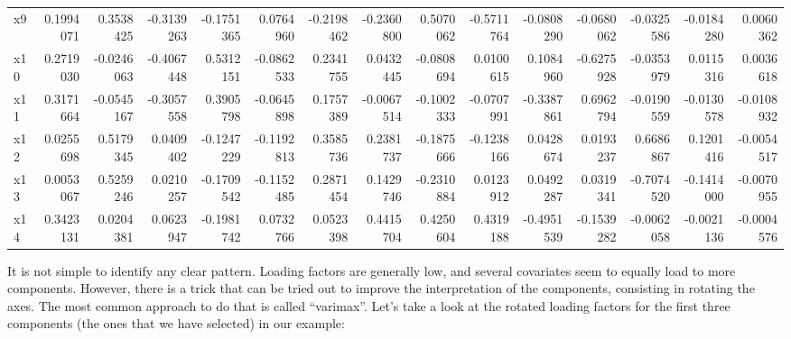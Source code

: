 \documentclass[
]{book}
\newenvironment{Shaded}{\begin{snugshade}}{\end{snugshade}}
\newcommand{\DecValTok}[1]{\textcolor[rgb]{0.00,0.00,0.81}{#1}}
\newcommand{\FunctionTok}[1]{\textcolor[rgb]{0.00,0.00,0.00}{#1}}
\newcommand{\NormalTok}[1]{#1}
\newcommand{\OtherTok}[1]{\textcolor[rgb]{0.56,0.35,0.01}{#1}}
\newcommand{\SpecialCharTok}[1]{\textcolor[rgb]{0.00,0.00,0.00}{#1}}
\begin{document}
\begin{table}
\begin{tabular}[t]{lrrrrrrrrrrrrrr}
x9 & 0.1994071 & 0.3538425 & -0.3139263 & -0.1751365 & 0.0764960 & -0.2198462 & -0.2360800 & 0.5070062 & -0.5711764 & -0.0808290 & -0.0680062 & -0.0325586 & -0.0184280 & 0.0060362\\
x10 & 0.2719030 & -0.0246063 & -0.4067448 & 0.5312151 & -0.0862533 & 0.2341755 & 0.0432445 & -0.0808694 & 0.0100615 & 0.1084960 & -0.6275928 & -0.0353979 & 0.0115316 & 0.0036618\\
\addlinespace
x11 & 0.3171664 & -0.0545167 & -0.3057558 & 0.3905798 & -0.0645898 & 0.1757389 & -0.0067514 & -0.1002333 & -0.0707991 & -0.3387861 & 0.6962794 & -0.0190559 & -0.0130578 & -0.0108932\\
x12 & 0.0255698 & 0.5179345 & 0.0409402 & -0.1247229 & -0.1192813 & 0.3585736 & 0.2381737 & -0.1875666 & -0.1238166 & 0.0428674 & 0.0193237 & 0.6686867 & 0.1201416 & -0.0054517\\
x13 & 0.0053067 & 0.5259246 & 0.0210257 & -0.1709542 & -0.1152485 & 0.2871454 & 0.1429746 & -0.2310884 & 0.0123912 & 0.0492287 & 0.0319341 & -0.7074520 & -0.1414000 & -0.0070955\\
x14 & 0.3423131 & 0.0204381 & 0.0623947 & -0.1981742 & 0.0732766 & 0.0523398 & 0.4415704 & 0.4250604 & 0.4319188 & -0.4951539 & -0.1539282 & -0.0062058 & -0.0021136 & -0.0004576\\
\bottomrule
\end{tabular}
\end{table}

It is not simple to identify any clear pattern. Loading factors are generally low, and several covariates seem to equally load to more components. However, there is a trick that can be tried out to improve the interpretation of the components, consisting in rotating the axes. The most common approach to do that is called ``varimax''. Let's take a look at the rotated loading factors for the first three components (the ones that we have selected) in our example:

\begin{Shaded}
\end{Shaded}
\end{document}
